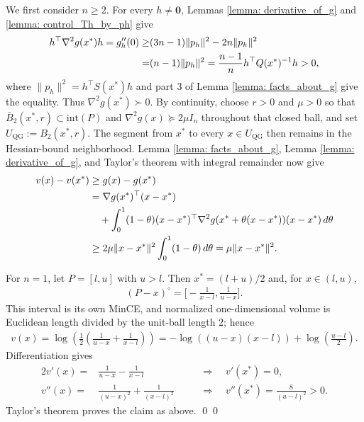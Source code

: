 \documentclass[smallextended]{svjour3}
\let\springerproof\proof
\let\endspringerproof\endproof
\renewenvironment{proof}{\springerproof}{%
  \ifhmode\qed\else\leavevmode\qed\fi\endspringerproof}
\begin{document}
\begin{proof}
    We first consider $n \geq 2$. For every $h\ne\mathbf0$, Lemmas
    \ref{lemma: derivative_of_g} and \ref{lemma: control_Th_by_ph} give
    \begin{align}
     h^\top \nabla^2 g(x^*) h  = g''_h(0) \notag \geq & (3n-1)\|p_h\|^2 - 2n\|p_h\|^2 \notag \\
        = & (n-1)\|p_h\|^2 = \frac{n-1}{n}h^\top Q(x^*)^{-1}h > 0, \notag
    \end{align}
    where $\|p_h\|^2=h^\top S(x^*)h$ and part 3 of Lemma \ref{lemma: facts_about_g}
    give the equality. Thus $\nabla^2g(x^*)\succ0$. By continuity, choose
    $r>0$ and $\mu>0$ so that
    $\bar B_2(x^*,r)\subset\mathrm{int}(P)$ and
    $\nabla^2g(x)\succeq2\mu I_n$ throughout that closed ball, and set
    $U_{\mathrm{QG}}:=B_2(x^*,r)$. The segment from $x^*$ to every
    $x\in U_{\mathrm{QG}}$ then remains in the Hessian-bound neighborhood.
    Lemma \ref{lemma: facts_about_g}, Lemma \ref{lemma: derivative_of_g},
    and Taylor's theorem with integral remainder now give
    \begin{align*}
        v(x)-v(x^*)
        &\geq g(x)-g(x^*) \\
        &=\nabla g(x^*)^\top(x-x^*) \\
        &\quad+\intop\nolimits_0^1(1-\theta)(x-x^*)^\top
        \nabla^2g(x^*+\theta(x-x^*))(x-x^*)\,d\theta \\
        &\geq2\mu\|x-x^*\|^2\intop\nolimits_0^1(1-\theta)\,d\theta
        =\mu\|x-x^*\|^2.
    \end{align*}

    For $n=1$, let $P=[l,u]$ with $u>l$. Then $x^*=(l+u)/2$ and, for $x\in(l,u)$,
    \begin{align*}
        (P-x)^\circ = \Big[-\frac{1}{x-l}, \frac{1}{u-x}\Big].
    \end{align*}
    This interval is its own MinCE, and normalized one-dimensional volume is
    Euclidean length divided by the unit-ball length $2$; hence
    \begin{align*}
        v(x) = \log\left(\frac{1}{2}\left( \frac{1}{u-x} + \frac{1}{x-l}\right)\right) = -\log((u-x)(x-l)) + \log\left(\frac{u-l}{2}\right).
    \end{align*}
    Differentiation gives
    \begin{alignat*}{2}
        v'(x) = & \frac{1}{u-x} - \frac{1}{x-l} \quad &&  \Rightarrow \quad v'(x^*) =  0, \\
        v''(x) =&    \frac{1}{(u-x)^2} + \frac{1}{(x-l)^2} \quad &&               \Rightarrow \quad  v''(x^*) = \frac{8}{(u-l)^2} > 0.
    \end{alignat*}
    Taylor's theorem proves the claim as above.
\end{proof}
\end{document}
